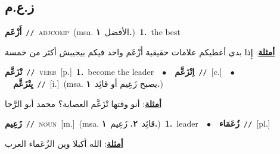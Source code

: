 \documentclass[10pt,a4paper,twoside]{article} %
\begin{document}
\begin{multicols}{2}
\vspace{-3mm}
\subsection*{\color{blue}\foreignlanguage{arabic}{ز.ع.م}\color{blue}{}} 

{\setlength\topsep{0pt}\textbf{\foreignlanguage{arabic}{أَزْعَم}}\ {\color{gray}\texttt{//}\color{black}}\ \textsc{adj\textunderscore comp}\ \color{gray}(msa. \foreignlanguage{arabic}{الأفضل}~\foreignlanguage{arabic}{\textbf{١.}})\color{black}\ \textbf{1.}~the best\  \begin{flushright}\color{gray}\foreignlanguage{arabic}{\textbf{\underline{\foreignlanguage{arabic}{أمثلة}}}: إِذا بدي أعطيكم علامات حقيقية أَزْعَم واحد فيكم بيجيبش أكثر من خمسة}\end{flushright}\color{black}} \vspace{2mm}

{\setlength\topsep{0pt}\textbf{\foreignlanguage{arabic}{تْزَعَّم}}\ {\color{gray}\texttt{//}\color{black}}\ \textsc{verb}\ [p.]\ \textbf{1.}~become the leader\ \ $\bullet$\ \ \setlength\topsep{0pt}\textbf{\foreignlanguage{arabic}{اِتْزَعَّم}}\ {\color{gray}\texttt{//}\color{black}}\ [c.]\ \ $\bullet$\ \ \setlength\topsep{0pt}\textbf{\foreignlanguage{arabic}{يِتْزَعَّم}}\ {\color{gray}\texttt{//}\color{black}}\ [i.]\ \color{gray}(msa. \foreignlanguage{arabic}{يصبح زَعِيم أو قائِد}~\foreignlanguage{arabic}{\textbf{١.}})\color{black}\  \begin{flushright}\color{gray}\foreignlanguage{arabic}{\textbf{\underline{\foreignlanguage{arabic}{أمثلة}}}: أنو وقتها تْزَعَّم العصابة؟ محمد أبو الرَّجا}\end{flushright}\color{black}} \vspace{2mm}

{\setlength\topsep{0pt}\textbf{\foreignlanguage{arabic}{زَعِيم}}\ {\color{gray}\texttt{//}\color{black}}\ \textsc{noun}\ [m.]\ \color{gray}(msa. \foreignlanguage{arabic}{قائِد}~\foreignlanguage{arabic}{\textbf{٢.}}  \foreignlanguage{arabic}{زَعِيم}~\foreignlanguage{arabic}{\textbf{١.}})\color{black}\ \textbf{1.}~leader\ \ $\bullet$\ \ \setlength\topsep{0pt}\textbf{\foreignlanguage{arabic}{زُعَمَاء}}\ {\color{gray}\texttt{//}\color{black}}\ [pl.]\  \begin{flushright}\color{gray}\foreignlanguage{arabic}{\textbf{\underline{\foreignlanguage{arabic}{أمثلة}}}: الله أكبلا وين الزُعَماء العرب}\end{flushright}\color{black}} \vspace{2mm}


\end{multicols}
\end{document}
